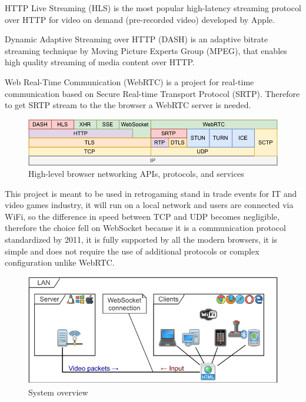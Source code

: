 HTTP Live Streaming (HLS) is the most popular high-latency streaming protocol over HTTP for video on demand (pre-recorded video) developed by Apple.

Dynamic Adaptive Streaming over HTTP (DASH) is an adaptive bitrate streaming technique by Moving Picture Experts Group (MPEG), that enables high quality streaming of media content over HTTP.

Web Real-Time Communication (WebRTC) is a project for real-time communication based on Secure Real-time Transport Protocol (SRTP). Therefore to get SRTP stream to the the browser a WebRTC server is needed\cite{High_Performance_Browser_Networking}.

\begin{figure}[H]
	\includegraphics[width=\linewidth]{immagini/webprotocols}
	\caption{High-level browser networking APIs, protocols, and services}
	\label{fig:webprotocols}
\end{figure}

This project is meant to be used in retrogaming stand in trade events for IT and video games industry, it will run on a local network and users are connected via WiFi, so the difference in speed between TCP and UDP becomes negligible, therefore the choice fell on WebSocket because it is a communication protocol standardized by 2011, it is fully supported by all the modern browsers, it is simple and does not require the use of additional protocols or complex configuration unlike WebRTC.

\begin{figure}[H]
	\includegraphics[width=\linewidth]{immagini/proposed_system}
	\caption{System overview}
	\label{fig:proposed_system}
\end{figure}

